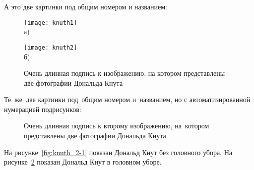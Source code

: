 А это две картинки под общим номером и названием:
\begin{figure}[ht]
    \begin{minipage}[b][][b]{0.49\linewidth}\centering
        \texttt{[image: knuth1]} \\ а)
    \end{minipage}
    \hfill
    \begin{minipage}[b][][b]{0.49\linewidth}\centering
        \texttt{[image: knuth2]} \\ б)
    \end{minipage}
    \caption{Очень длинная подпись к изображению,
        на котором представлены две фотографии Дональда Кнута}
    \label{fig:knuth}
\end{figure}

Те~же~две картинки под~общим номером и~названием,
но с автоматизированной нумерацией подрисунков:
\begin{figure}[ht]
    \caption[Этот текст попадает в названия рисунков в списке рисунков]{Очень
        длинная подпись к второму изображению, на~котором представлены две
        фотографии Дональда Кнута}\label{fig:knuth_2}
\end{figure}

На рисунке~\cref{fig:knuth_2-1} показан Дональд Кнут без головного убора.
На рисунке~\cref{fig:knuth_2}
показан Дональд Кнут в головном уборе.

